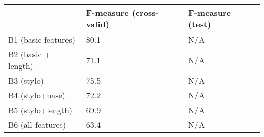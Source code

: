 \begin{tabular}{l|p{2cm}p{2cm}}
~ & F-measure (cross-valid) & F-measure (test)\\
\hline
B1 (basic features)     & 80.1&N/A  \\
B2 (basic + length)     & 71.1&N/A  \\
B3 (stylo)              & 75.5&N/A  \\
B4 (stylo+base)         & 72.2&N/A  \\
B5 (stylo+length)       & 69.9&N/A  \\
B6 (all features)       & 63.4 &N/A \\
\hline
\end{tabular}